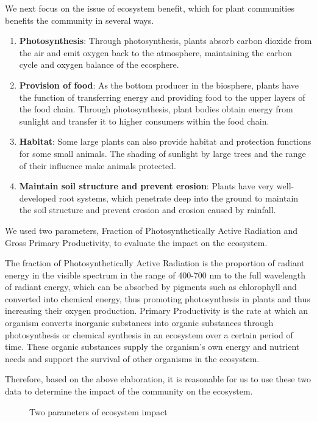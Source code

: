\documentclass[12pt]{article}
\begin{document}
We next focus on the issue of ecosystem benefit, which for plant communities benefits the community in several ways.

\begin{enumerate}
	\item \textbf{Photosynthesis}: Through photosynthesis, plants absorb carbon dioxide from the air and emit oxygen back to the atmosphere, maintaining the carbon cycle and oxygen balance of the ecosphere.
	\item \textbf{Provision of food}: As the bottom producer in the biosphere, plants have the function of transferring energy and providing food to the upper layers of the food chain. Through photosynthesis, plant bodies obtain energy from sunlight and transfer it to higher consumers within the food chain.
	\item \textbf{Habitat}: Some large plants can also provide habitat and protection functions for some small animals. The shading of sunlight by large trees and the range of their influence make animals protected.
	\item \textbf{Maintain soil structure and prevent erosion}: Plants have very well-developed root systems, which penetrate deep into the ground to maintain the soil structure and prevent erosion and erosion caused by rainfall.
\end{enumerate}

We used two parameters, Fraction of Photosynthetically Active Radiation and Gross Primary Productivity, to evaluate the impact on the ecosystem.

The fraction of Photosynthetically Active Radiation is the proportion of radiant energy in the visible spectrum in the range of 400-700 nm to the full wavelength of radiant energy, which can be absorbed by pigments such as chlorophyll and converted into chemical energy, thus promoting photosynthesis in plants and thus increasing their oxygen production. Primary Productivity is the rate at which an organism converts inorganic substances into organic substances through photosynthesis or chemical synthesis in an ecosystem over a certain period of time. These organic substances supply the organism's own energy and nutrient needs and support the survival of other organisms in the ecosystem.

Therefore, based on the above elaboration, it is reasonable for us to use these two data to determine the impact of the community on the ecosystem.

\begin{figure}[htb]
	\centering
	\caption{Two parameters of ecosystem impact}
\end{figure}
\end{document}
